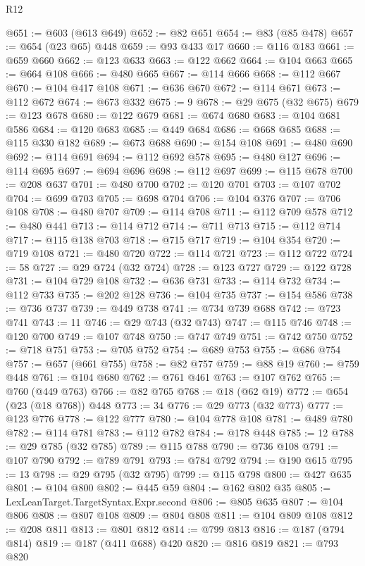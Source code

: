 \begin{lexlean}{R12}
\begin{coremodule}
@651 := @603 (@613 @649)
@652 := @82 @651
@654 := @83 (@85 @478)
@657 := @654 (@23 @65) @448
@659 := @93 @433 @17
@660 := @116 @183
@661 := @659 @660
@662 := @123 @633
@663 := @122 @662
@664 := @104 @663
@665 := @664 @108
@666 := @480 @665
@667 := @114 @666
@668 := @112 @667
@670 := @104 @417 @108
@671 := @636 @670
@672 := @114 @671
@673 := @112 @672
@674 := @673 @332
@675 := 9
@678 := @29 @675 (@32 @675)
@679 := @123 @678
@680 := @122 @679
@681 := @674 @680
@683 := @104 @681 @586
@684 := @120 @683
@685 := @449 @684
@686 := @668 @685
@688 := @115 @330 @182
@689 := @673 @688
@690 := @154 @108
@691 := @480 @690
@692 := @114 @691
@694 := @112 @692 @578
@695 := @480 @127
@696 := @114 @695
@697 := @694 @696
@698 := @112 @697
@699 := @115 @678
@700 := @208 @637
@701 := @480 @700
@702 := @120 @701
@703 := @107 @702
@704 := @699 @703
@705 := @698 @704
@706 := @104 @376
@707 := @706 @108
@708 := @480 @707
@709 := @114 @708
@711 := @112 @709 @578
@712 := @480 @441
@713 := @114 @712
@714 := @711 @713
@715 := @112 @714
@717 := @115 @138 @703
@718 := @715 @717
@719 := @104 @354
@720 := @719 @108
@721 := @480 @720
@722 := @114 @721
@723 := @112 @722
@724 := 58
@727 := @29 @724 (@32 @724)
@728 := @123 @727
@729 := @122 @728
@731 := @104 @729 @108
@732 := @636 @731
@733 := @114 @732
@734 := @112 @733
@735 := @202 @128
@736 := @104 @735
@737 := @154 @586
@738 := @736 @737
@739 := @449 @738
@741 := @734 @739 @688
@742 := @723 @741
@743 := 11
@746 := @29 @743 (@32 @743)
@747 := @115 @746
@748 := @120 @700
@749 := @107 @748
@750 := @747 @749
@751 := @742 @750
@752 := @718 @751
@753 := @705 @752
@754 := @689 @753
@755 := @686 @754
@757 := @657 (@661 @755)
@758 := @82 @757
@759 := @88 @19
@760 := @759 @448
@761 := @104 @680
@762 := @761 @461
@763 := @107 @762
@765 := @760 (@449 @763)
@766 := @82 @765
@768 := @18 (@62 @19)
@772 := @654 (@23 (@18 @768)) @448
@773 := 34
@776 := @29 @773 (@32 @773)
@777 := @123 @776
@778 := @122 @777
@780 := @104 @778 @108
@781 := @489 @780
@782 := @114 @781
@783 := @112 @782
@784 := @178 @448
@785 := 12
@788 := @29 @785 (@32 @785)
@789 := @115 @788
@790 := @736 @108
@791 := @107 @790
@792 := @789 @791
@793 := @784 @792
@794 := @190 @615
@795 := 13
@798 := @29 @795 (@32 @795)
@799 := @115 @798
@800 := @427 @635
@801 := @104 @800
@802 := @445 @59
@804 := @162 @802 @35
@805 := LexLeanTarget.TargetSyntax.Expr.second
@806 := @805 @635
@807 := @104 @806
@808 := @807 @108
@809 := @804 @808
@811 := @104 @809 @108
@812 := @208 @811
@813 := @801 @812
@814 := @799 @813
@816 := @187 (@794 @814)
@819 := @187 (@411 @688) @420
@820 := @816 @819
@821 := @793 @820

\end{coremodule}
\end{lexlean}
